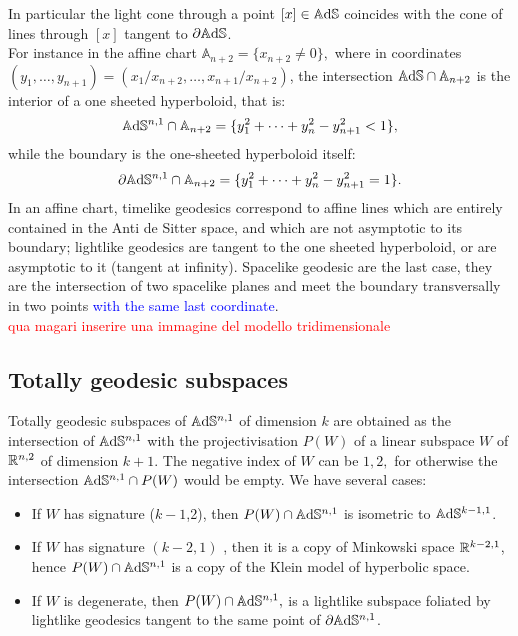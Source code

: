 In particular the light cone through a point $[x]\in \mathbb{A}\mathrm{d}\mathbb{S}$ coincides with the cone of lines through $[x]$ tangent to $\partial \mathbb{A}\mathrm{d}\mathbb{S}$.\\ For instance in the affine chart $\mathbb{A}_{n+2}=\{x_{n+2}\neq 0\},$ where in coordinates $(y_1, \dots, y_{n+1})=(x_1/x_{n+2},\dots, x_{n+1}/x_{n+2})$, the intersection $\mathbb{A}\mathrm{d}\mathbb{S}\cap\mathbb{A}_{n+2}$ is the interior of a one sheeted hyperboloid, that is: 
\[
    \mathbb{A}\mathrm{d}\mathbb{S}^{n,1}\cap\mathbb{A}_{n+2}=\{y_1^2+\dots+y_n^2-y_{n+1}^2<1\},
\]
 while the boundary is the one-sheeted hyperboloid itself: 
 \[
    \partial\mathbb{A}\mathrm{d}\mathbb{S}^{n,1}\cap\mathbb{A}_{n+2}=\{y_1^2+\dots+y_n^2-y_{n+1}^2=1\}.
\]
In an affine chart, timelike geodesics correspond to affine lines which are entirely contained in the Anti de Sitter space, and which are not asymptotic to its boundary; lightlike geodesics are tangent to the one sheeted hyperboloid, or are asymptotic to it (tangent at infinity). Spacelike geodesic are the last case, they are the intersection of two spacelike planes and meet the boundary transversally in two points \textcolor{blue}{with the same last coordinate}.\\

\textcolor{red}{qua magari inserire una immagine del modello tridimensionale}


\subsection{Totally geodesic subspaces} Totally geodesic subspaces of $\mathbb{A}\mathrm{d}\mathbb{S}^{n,1}$ of dimension $k$ are obtained as the intersection of $\mathbb{A}\mathrm{d}\mathbb{S}^{n,1}$ with the projectivisation $P(W)$ of a linear subspace $W$ of $\mathbb{R}^{n,2}$ of dimension $k+1.$ The negative index of $W$ can be $1, 2,$ for otherwise the intersection $\mathbb{A}\mathrm{d}\mathbb{S}^{n,1}\cap P(W)$ would be empty. We have several cases: 
\begin{itemize}
    \item If $W$ has signature ($k-1$,2), then $P(W)\cap \mathbb{A}\mathrm{d}\mathbb{S}^{n,1}$ is isometric to $\mathbb{A}\mathrm{d}\mathbb{S}^{k-1,1}$. 
    \item If $W$ has signature $(k-2, 1)$ , then it is a copy of Minkowski space $\mathbb{R}^{k-2,1}$, hence $P(W)\cap \mathbb{A}\mathrm{d}\mathbb{S}^{n,1}$ is a copy of the Klein model of hyperbolic space. 
    \item If $W$ is degenerate, then $P(W)\cap \mathbb{A}\mathrm{d}\mathbb{S}^{n,1},$ is a lightlike subspace foliated by lightlike geodesics tangent to the same point of $\partial\mathbb{A}\mathrm{d}\mathbb{S}^{n,1}$. 
\end{itemize}  

